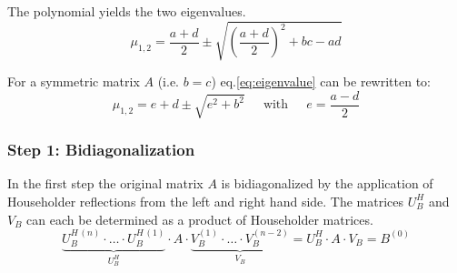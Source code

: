 The polynomial yields the two eigenvalues.
\begin{equation}
\label{eq:eigenvalue}
\mu_{1,2} = \dfrac{a + d}{2} \pm \sqrt{\left(\dfrac{a + d}{2}\right)^2 + bc - ad}
\end{equation}

For a symmetric matrix $A$ (i.e. $b = c$) eq.\eqref{eq:eigenvalue} can
be rewritten to:
\begin{equation}
\label{eq:eigenvalue_sym}
\mu_{1,2} = e + d  \pm \sqrt{e^2 + b^2}
\;\;\;\; \textrm{ with } \;\;\;\;
e = \dfrac{a - d}{2}
\end{equation}

\subsubsection{Step 1: Bidiagonalization}

In the first step the original matrix $A$ is bidiagonalized by the
application of Householder reflections from the left and right hand
side.  The matrices $U_B^H$ and $V_B$ can each be determined as a
product of Householder matrices.
\begin{equation}
\underbrace{U_B^{H\,(n)}\cdot\ldots\cdot U_B^{H\,(1)}}_{U_B^H}\cdot A\cdot
\underbrace{V_B^{(1)}\cdot\ldots\cdot V_B^{(n-2)}}_{V_B}
= U_B^H\cdot A\cdot V_B = B^{(0)}
\end{equation}

